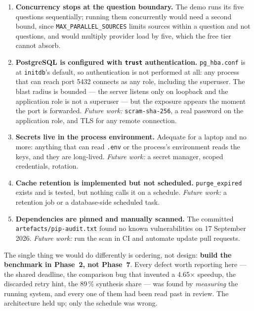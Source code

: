 \documentclass[10pt,a4paper]{article}
\begin{document}
\begin{enumerate}[leftmargin=1.6em,itemsep=0.15em]
  \item \textbf{Concurrency stops at the question boundary.} The demo runs its five questions
        sequentially; running them concurrently would need a second bound, since
        \texttt{MAX\_PARALLEL\_SOURCES} limits sources within a question and not questions, and
        would multiply provider load by five, which the free tier cannot absorb.

  \item \textbf{PostgreSQL is configured with \texttt{trust} authentication.} \texttt{pg\_hba.conf}
        is at \texttt{initdb}'s default, so authentication is not performed at all: any process
        that can reach port 5432 connects as any role, including the superuser. The blast radius
        is bounded --- the server listens only on loopback and the application role is not a
        superuser --- but the exposure appears the moment the port is forwarded.
        \emph{Future work:} \texttt{scram-sha-256}, a real password on the application role, and
        TLS for any remote connection.

  \item \textbf{Secrets live in the process environment.} Adequate for a laptop and no more:
        anything that can read \texttt{.env} or the process's environment reads the keys, and
        they are long-lived. \emph{Future work:} a secret manager, scoped credentials, rotation.

  \item \textbf{Cache retention is implemented but not scheduled.} \texttt{purge\_expired} exists
        and is tested, but nothing calls it on a schedule. \emph{Future work:} a retention job or
        a database-side scheduled task.

  \item \textbf{Dependencies are pinned and manually scanned.} The committed
        \texttt{artefacts/pip-audit.txt} found no known vulnerabilities on 17 September 2026.
        \emph{Future work:} run the scan in CI and automate update pull requests.
\end{enumerate}

The single thing we would do differently is ordering, not design: \textbf{build the benchmark in
Phase~2, not Phase~7}. Every defect worth reporting here --- the shared deadline, the
comparison bug that invented a 4.65$\times$ speedup, the discarded retry hint, the 89\,\%
synthesis share --- was found by \emph{measuring} the running system, and every one of them had
been read past in review. The architecture held up; only the schedule was wrong.
\end{document}
